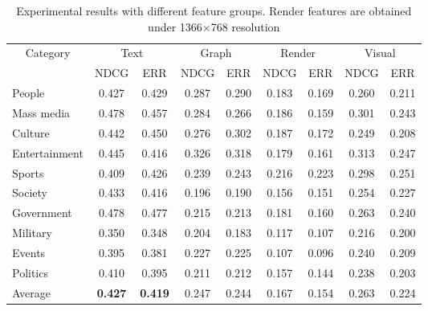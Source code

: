 \begin{table*}[]
\begin{tabular}{|l|cc|cc|cc|cc|}
\hline
\multicolumn{1}{|c|}{\multirow{2}{*}{Category}} & \multicolumn{2}{|c|}{Text} & \multicolumn{2}{|c|}{Graph} & \multicolumn{2}{|c|}{Render} & \multicolumn{2}{|c|}{Visual} \\
\multicolumn{1}{|l|}{} & \multicolumn{1}{|c}{NDCG} & \multicolumn{1}{c|}{ERR} & \multicolumn{1}{|c}{NDCG} & \multicolumn{1}{c|}{ERR} & \multicolumn{1}{|c}{NDCG} & \multicolumn{1}{c|}{ERR} & \multicolumn{1}{|c}{NDCG} & \multicolumn{1}{c|}{ERR} \\
\hline 
People & 0.427 & 0.429 & 0.287 & 0.290 & 0.183 & 0.169 & 0.260 & 0.211 \\

Mass media & 0.478 & 0.457 & 0.284 & 0.266 & 0.186 & 0.159 & 0.301 & 0.243 \\

Culture & 0.442 & 0.450 & 0.276 & 0.302 & 0.187 & 0.172 & 0.249 & 0.208 \\

Entertainment & 0.445 & 0.416 & 0.326 & 0.318 & 0.179 & 0.161 & 0.313 & 0.247 \\

Sports & 0.409 & 0.426 & 0.239 & 0.243 & 0.216 & 0.223 & 0.298 & 0.251 \\

Society & 0.433 & 0.416 & 0.196 & 0.190 & 0.156 & 0.151 & 0.254 & 0.227 \\

Government & 0.478 & 0.477 & 0.215 & 0.213 & 0.181 & 0.160 & 0.263 & 0.240 \\

Military & 0.350 & 0.348 & 0.204 & 0.183 & 0.117 & 0.107 & 0.216 & 0.200 \\

Events & 0.395 & 0.381 & 0.227 & 0.225 & 0.107 & 0.096 & 0.240 & 0.209 \\

Politics & 0.410 & 0.395 & 0.211 & 0.212 & 0.157 & 0.144 & 0.238 & 0.203 \\
\hline
Average & \textbf{0.427} & \textbf{0.419} & 0.247 & 0.244 & 0.167 & 0.154 & 0.263 & 0.224 \\
\hline           
\end{tabular}
\caption{Experimental results with different feature groups. Render features are obtained under 1366$\times$768 resolution}
\label{table_cmp2}
\end{table*}


